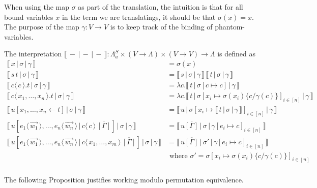 \documentclass[a4paper,UKenglish,cleveref, autoref]{lipics-v2019}
\newcommand{\FALC}{\Lambda^{S}_{a}}
\newcommand{\abs}[2]{\lambda #1 . #2}
\newcommand{\app}[2]{#1 \, #2}
\newcommand{\fake}[3]{#1 \langle \, #2 \, \rangle . #3}
\newcommand{\share}[3]{#1 [#2 \leftarrow #3]}
\newcommand{\dist}[5]{#1 [ #2 \, \vert \, \fakedist{#4}{#5} \, #3 ]}
\newcommand{\fakedist}[2]{#1 \langle \, #2 \, \rangle}
\newcommand{\sub}[3]{#1 \{ #2 / #3 \}}
\newcommand{\readbackwmap}[3]{\llbracket \, #1 \, \vert \, #2 \, \vert \, #3  \, \rrbracket }
\begin{document}
When using the map $\sigma$ as part of the translation, the intuition is that for all bound variables $x$ in the term we are translatings, it should be that $\sigma(x) = x$. The purpose of the map $\gamma : V \rightarrow V$ is to keep track of the binding of phantom-variables.

\begin{definition}
\label{def:readback}
The interpretation $\readbackwmap{-}{-}{-} : \FALC \times (V \rightarrow \Lambda) \times (V \rightarrow V) \rightarrow \Lambda$ is defined as
\begingroup
\allowdisplaybreaks
\begin{align*}
	\readbackwmap{x}{\sigma}{\gamma} &= \sigma(x) \\[0.2cm]
	\readbackwmap{\app{s}{t}}{\sigma}{\gamma} &= \app{\readbackwmap{s}{\sigma}{\gamma}}{\readbackwmap{t}{\sigma}{\gamma}} \\[0.2cm]
	\readbackwmap{\fake{c}{c}{t}}{\sigma}{\gamma} &= \abs{c}{\readbackwmap{t}{\sigma[c \mapsto c]}{\gamma}} \\[0.2cm]
	\readbackwmap{\fake{c}{x_{1}, \dots, x_{n}}{t}}{\sigma}{\gamma} &= \abs{c}{\readbackwmap{t}{\sigma[x_{i} \mapsto \sigma(x_{i}) \sub{}{c}{\gamma(c)}]_{i \in [n]}}{\gamma}} \\[0.2cm]
	\readbackwmap{\share{u}{x_{1}, \dots, x_{n}}{t}}{\sigma}{\gamma} &= \readbackwmap{u}{\sigma[x_{i} \mapsto \readbackwmap{t}{\sigma}{\gamma}]_{i \in [n]}}{\gamma} \\[0.2cm]
	\readbackwmap{\dist{u}{\fakedist{e_{1}}{\vec{w_{1}}}, \dots, \fakedist{e_{n}}{\vec{w_{n}}}}{\overline{[\Gamma]}}{c}{c}}{\sigma}{\gamma} &= \readbackwmap{u \overline{[\Gamma]}}{\sigma}{\gamma[e_{i} \mapsto c]_{i \in [n]}} \\[0.2cm]
	\readbackwmap{\dist{u}{\fakedist{e_{1}}{\vec{w_{1}}}, \dots, \fakedist{e_{n}}{\vec{w_{n}}}}{\overline{[\Gamma]}}{c}{x_{1}, \dots, x_{m}}}{\sigma}{\gamma} &= \readbackwmap{u \overline{[\Gamma]}}{\sigma'}{\gamma[e_{i} \mapsto c]_{i \in [n]}} \\
	 & \text{ where } \sigma' = \sigma[x_{i} \mapsto \sigma(x_{i}) \sub{}{c}{\gamma(c)}]_{i \in [n]} \\
\end{align*}
\endgroup

\end{definition}


\noindent The following Proposition justifies working modulo permutation equivalence.
\end{document}
